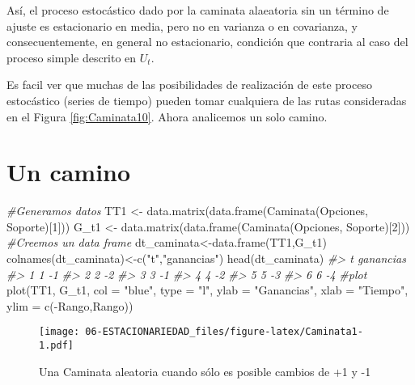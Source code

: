 \documentclass[
]{book}
\newenvironment{Shaded}{\begin{snugshade}}{\end{snugshade}}
\newcommand{\AttributeTok}[1]{\textcolor[rgb]{0.77,0.63,0.00}{#1}}
\newcommand{\CommentTok}[1]{\textcolor[rgb]{0.56,0.35,0.01}{\textit{#1}}}
\newcommand{\DecValTok}[1]{\textcolor[rgb]{0.00,0.00,0.81}{#1}}
\newcommand{\FunctionTok}[1]{\textcolor[rgb]{0.00,0.00,0.00}{#1}}
\newcommand{\NormalTok}[1]{#1}
\newcommand{\OtherTok}[1]{\textcolor[rgb]{0.56,0.35,0.01}{#1}}
\newcommand{\SpecialCharTok}[1]{\textcolor[rgb]{0.00,0.00,0.00}{#1}}
\newcommand{\StringTok}[1]{\textcolor[rgb]{0.31,0.60,0.02}{#1}}
\begin{document}
Así, el proceso estocástico dado por la caminata alaeatoria sin un
término de ajuste es estacionario en media, pero no en varianza o en
covarianza, y consecuentemente, en general no estacionario, condición
que contraria al caso del proceso simple descrito en \(U_t\).

Es facil ver que muchas de las posibilidades de realización de este
proceso estocástico (series de tiempo) pueden tomar cualquiera de las
rutas consideradas en el Figura \ref{fig:Caminata10}. Ahora analicemos
un solo camino.

\hypertarget{un-camino}{%
\section{Un camino}\label{un-camino}}

\begin{Shaded}
\begin{Highlighting}[]
\CommentTok{\#Generamos datos}
\NormalTok{  TT1 }\OtherTok{\textless{}{-}} \FunctionTok{data.matrix}\NormalTok{(}\FunctionTok{data.frame}\NormalTok{(}\FunctionTok{Caminata}\NormalTok{(Opciones, Soporte)[}\DecValTok{1}\NormalTok{]))}
\NormalTok{  G\_t1 }\OtherTok{\textless{}{-}} \FunctionTok{data.matrix}\NormalTok{(}\FunctionTok{data.frame}\NormalTok{(}\FunctionTok{Caminata}\NormalTok{(Opciones, Soporte)[}\DecValTok{2}\NormalTok{]))}
\CommentTok{\#Creemos un data frame}
\NormalTok{  dt\_caminata}\OtherTok{\textless{}{-}}\FunctionTok{data.frame}\NormalTok{(TT1,G\_t1)}
  \FunctionTok{colnames}\NormalTok{(dt\_caminata)}\OtherTok{\textless{}{-}}\FunctionTok{c}\NormalTok{(}\StringTok{"t"}\NormalTok{,}\StringTok{"ganancias"}\NormalTok{)}
  \FunctionTok{head}\NormalTok{(dt\_caminata)}
\CommentTok{\#\textgreater{}   t ganancias}
\CommentTok{\#\textgreater{} 1 1        {-}1}
\CommentTok{\#\textgreater{} 2 2        {-}2}
\CommentTok{\#\textgreater{} 3 3        {-}1}
\CommentTok{\#\textgreater{} 4 4        {-}2}
\CommentTok{\#\textgreater{} 5 5        {-}3}
\CommentTok{\#\textgreater{} 6 6        {-}4}
\CommentTok{\#plot}
  \FunctionTok{plot}\NormalTok{(TT1, G\_t1, }\AttributeTok{col =} \StringTok{"blue"}\NormalTok{, }\AttributeTok{type =} \StringTok{"l"}\NormalTok{, }\AttributeTok{ylab =} \StringTok{"Ganancias"}\NormalTok{, }\AttributeTok{xlab =} \StringTok{"Tiempo"}\NormalTok{, }\AttributeTok{ylim =} \FunctionTok{c}\NormalTok{(}\SpecialCharTok{{-}}\NormalTok{Rango,Rango))}
\end{Highlighting}
\end{Shaded}

\begin{figure}
\centering
\texttt{[image: 06-ESTACIONARIEDAD\_files/figure-latex/Caminata1-1.pdf]}
\caption{\label{fig:Caminata1}Una Caminata aleatoria cuando sólo es posible cambios de +1 y -1}
\end{figure}
\end{document}
